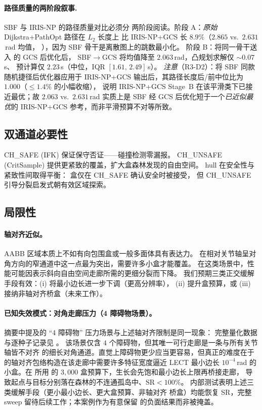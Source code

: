\documentclass[journal]{IEEEtran}
\begin{document}
\paragraph{路径质量的两阶段叙事.} SBF 与 IRIS-NP 的路径质量对比必须分
两阶段阅读。阶段 A：\emph{原始} Dijkstra+PathOpt 路径在 $L_2$ 长度上
比 IRIS-NP+GCS 长 $8.9\%$（$2.865$ vs.\ $2.631$\,rad 均值，
），因为 SBF 骨干是离散图上的跳数最小化。
阶段 B：将同一骨干送入  的 GCS 后优化后，
SBF$\to$GCS 将均值降至 $2.063$\,rad，凸规划求解仅 ${\sim}0.07$\,s、
预计算仅 $2.23$\,s（中位，IQR $[1.61,\,2.49]$\,s）。
\emph{注意}（R3-D2）：将 SBF 同款随机捷径后优化器应用于 IRIS-NP+GCS
输出后，其路径长度后/前中位比为 $1.000$（$\le 1.4\%$ 的小幅收缩），
说明 IRIS-NP+GCS Stage~B 在该平滑类下已接近最优；故 $2.063$ vs.\
$2.631$\,rad 实质上是 SBF 经 GCS 后优化短于一个\emph{已近似最优}的
IRIS-NP+GCS 参考，而非平滑预算不对等所致。

\subsection{双通道必要性}

CH\_SAFE (IFK) 保证保守否证——碰撞检测零漏报。
CH\_UNSAFE (CritSample) 提供更紧致的覆盖，扩大盒森林发现的自由空间。
hull 在安全性与紧致性间取得平衡：
盒仅在 CH\_SAFE 确认安全时被接受，
但 CH\_UNSAFE 引导分裂启发式朝有效区域探索。

\subsection{局限性}

\paragraph{轴对齐近似。}
AABB 区域本质上不如有向包围盒或一般多面体具有表达力。
在相对关节轴呈对角方向的窄通道中这一点最为突出，需要许多小盒才能覆盖。
在这类场景中，性能可能因表示斜向自由空间走廊所需的更细分裂而下降。
我们预期三类正交缓解手段有效：(i) 将最小边长进一步下调（更高分辨率），
(ii) 提升盒预算，或 (iii) 接纳非轴对齐桥盒（未来工作）。

\paragraph{已知失效模式：对角走廊压力（4 障碍物场景）。}
摘要中提及的 ``4 障碍物'' 压力场景与上述轴对齐限制是同一现象：
完整量化数据与逐种子记录见 。
该场景仅含 $4$ 个障碍物，但其唯一可行走廊是一条与所有关节轴皆不对齐
的细长对角通道。直觉上障碍物更少应当更容易，但真正的难度在于
 的轴对齐包络构造在该走廊中需要许多特征宽度逼近
LECT 最小边长 $10^{-4}$\,rad 的小盒。在  所用
的 $3{,}000$ 盒预算下，生长会先饱和最小边长上限再桥接走廊，
导致起点与目标分别落在森林的不连通孤岛中、$\text{SR}<100\%$。
内部测试表明上述三类缓解手段（更小最小边长、更大盒预算、非轴对齐
桥盒）均能恢复 SR，完整 sweep 留待后续工作；本案例作为有意保留
的负面结果而非被掩盖。
\end{document}
